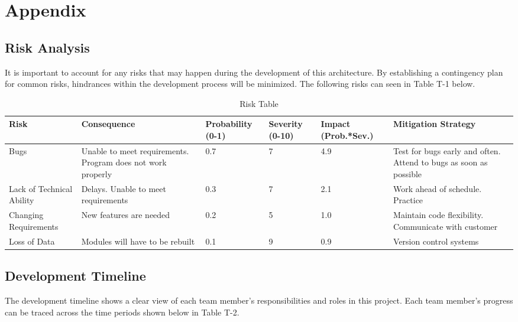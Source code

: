 \chapter{Appendix}

\section{Risk Analysis}
It is important to account for any risks that may happen during the development of this architecture. By establishing a contingency plan for common risks, hindrances within the development process will be minimized. The following risks can seen in Table T-1 below.

\begin{table}
\caption{Risk Table}
\label{arm:table}
\begin{center}
\begin{tabularx}{\textwidth}{|l|l|l|l|l|l|}\hline
	Risk & Consequence & Probability (0-1) & Severity (0-10) & Impact (Prob.*Sev.) & Mitigation Strategy
	\\\hline
	Bugs & Unable to meet requirements. Program does not work properly & 0.7 & 7 & 4.9 & Test for bugs early and often. Attend to bugs as soon as possible
	\\\hline
	Lack of Technical Ability & Delays. Unable to meet requirements & 0.3 & 7 & 2.1 & Work ahead of schedule. Practice
	\\\hline
	Changing Requirements & New features are needed & 0.2 & 5 & 1.0 & Maintain code flexibility. Communicate with customer
	\\\hline
	Loss of Data & Modules will have to be rebuilt & 0.1 & 9 & 0.9 & Version control systems
\end{tabularx}
\end{center}
\end{table}

\clearpage
\newpage

\section{Development Timeline}
The development timeline shows a clear view of each team member’s responsibilities and roles in this project. Each team member’s progress can be traced across the time periods shown below in Table T-2.

